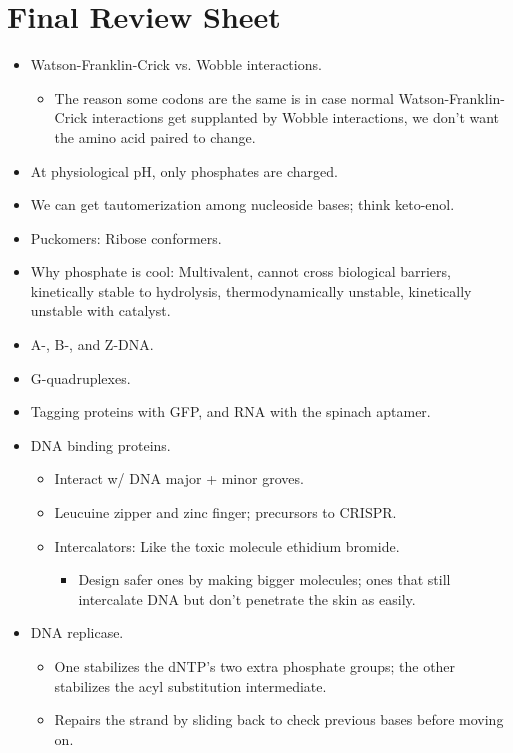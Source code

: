 \documentclass[../notes.tex]{subfiles}
\begin{document}
\section{Final Review Sheet}
\begin{itemize}
    \item {}Watson-Franklin-Crick vs. Wobble interactions.
    \begin{itemize}
        \item The reason some codons are the same is in case normal Watson-Franklin-Crick interactions get supplanted by Wobble interactions, we don't want the amino acid paired to change.
    \end{itemize}
    \item At physiological pH, only phosphates are charged.
    \item We can get tautomerization among nucleoside bases; think keto-enol.
    \item Puckomers: Ribose conformers.
    \item Why phosphate is cool: Multivalent, cannot cross biological barriers, kinetically stable to hydrolysis, thermodynamically unstable, kinetically unstable with catalyst.
    \item A-, B-, and Z-DNA.
    \item G-quadruplexes.
    \item Tagging proteins with GFP, and RNA with the spinach aptamer.
    \item DNA binding proteins.
    \begin{itemize}
        \item Interact w/ DNA major + minor groves.
        \item Leucuine zipper and zinc finger; precursors to CRISPR.
        \item Intercalators: Like the toxic molecule ethidium bromide.
        \begin{itemize}
            \item Design safer ones by making bigger molecules; ones that still intercalate DNA but don't penetrate the skin as easily.
        \end{itemize}
    \end{itemize}
    \item DNA replicase.
    \begin{itemize}
        \item One  stabilizes the dNTP's two extra phosphate groups; the other stabilizes the acyl substitution intermediate.
        \item Repairs the strand by sliding back to check previous bases before moving on.

\end{itemize}
\end{itemize}
\end{document}

